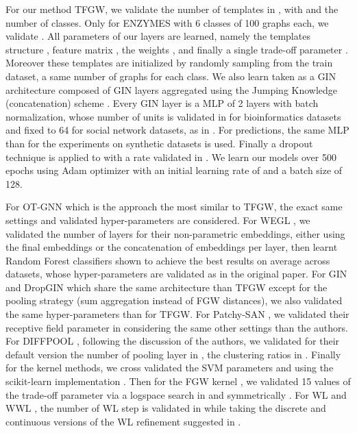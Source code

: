 \documentclass{article}
\begin{document}
{For our method TFGW, we validate the number of templates  in , with  and  the number of classes. Only for ENZYMES with 6 classes of 100 graphs each, we validate .
All parameters of our  layers are learned, namely the templates structure , feature matrix , the weights , and finally a single trade-off parameter . Moreover these templates are initialized by randomly sampling from the train dataset, a same number of graphs for each class. We also learn  taken as a GIN architecture
\cite{xu2018powerful} composed of  GIN layers aggregated using the Jumping Knowledge (concatenation) scheme \cite{xu2018representation}. Every GIN layer is a MLP of 2 layers with batch normalization, whose number of units is validated in  for bioinformatics datasets and fixed to 64 for social network datasets, as in \cite{xu2018powerful}. For predictions, the same MLP  than for the experiments on synthetic datasets is used. Finally a dropout technique is applied to  with a rate validated in . We learn our models over 500 epochs using Adam optimizer with an initial learning rate of  and a batch size of 128.

For OT-GNN \cite{chen2020optimal} which is the approach the most similar to TFGW, the exact same settings and validated hyper-parameters are considered. For WEGL \cite{kolouri2020wasserstein}, we validated the number of layers  for their non-parametric embeddings, either using the final embeddings or the concatenation of embeddings per layer, then learnt Random Forest classifiers shown to achieve the best results on average across datasets, whose hyper-parameters are validated as in the original paper. For GIN \cite{xu2018powerful} and DropGIN \cite{papp2021dropgnn} which share the same architecture than TFGW except for the pooling strategy (sum aggregation instead of FGW distances), we also validated the same hyper-parameters than for TFGW. For Patchy-SAN \cite{niepert2016learning}, we validated their receptive field parameter in  considering the same other settings than the authors. For DIFFPOOL \cite{ying2018hierarchical}, following the discussion of the authors, we validated for their default version the number of pooling layer in , the clustering ratios in . Finally for the kernel methods, we cross validated the SVM parameters  and  using the scikit-learn implementation \cite{sklearn_api}. Then for the FGW kernel \cite{titouan2019optimal}, we validated 15 values of the trade-off parameter  via a logspace search in  and symmetrically
. For WL \cite{shervashidze2011weisfeiler} and WWL \cite{Togninalli19}, the number of WL step is validated in  while taking the discrete and continuous versions of the WL refinement suggested in \cite{Togninalli19}.

}
\end{document}
